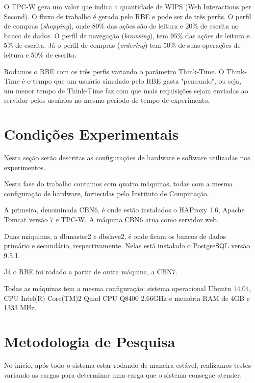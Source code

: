 \documentclass[11pt,twoside]{article}
\begin{document}
    O TPC-W gera um valor que indica a quantidade de WIPS (Web Interactions per Second). O fluxo de trabalho é gerado pelo RBE e pode ser de tr\^es perfis. O perfil de compras (\textit{shopping}), onde 80\% das a\c{c}\~oes são de leitura e 20\% de escrita no banco de dados. O perfil de navega\c{c}\~ao (\textit{browsing}), tem 95\% das a\c{c}\~oes de leitura e 5\% de escrita. J\'a o perfil de compras (\textit{ordering}) tem 50\% de suas opera\c{c}\~oes de leitura e 50\% de escrita.

    Rodamos o RBE com os três perfis variando o parâmetro Think-Time. O Think-Time é o tempo que um usuário simulado pelo RBE gasta "pensando", ou seja, um menor tempo de Think-Time faz com que mais requisições sejam enviadas ao servidor pelos usuários no mesmo período de tempo de experimento.

\setlength{\parindent}{4ex}


\section{Condições Experimentais}
\setlength{\parindent}{4ex}
     Nesta se\c{c}\~ao ser\~ao descritas as configura\c{c}\~oes de hardware e software utilizadas nos experimentos.

     Nesta fase do trabalho contamos com quatro máquinas, todas com a mesma configuração de hardware, fornecidas pelo Instituto de Computação.

     A primeira, denominada CBN6, é onde estão instalados o HAProxy 1.6, Apache Tomcat versão 7 e TPC-W. A máquina CBN6 atua como servidor web.

     Duas máquinas, a dbmaster2 e dbslave2, é onde ficam os bancos de dados primário e secundário, respectivamente. Nelas está instalado o PostgreSQL vers\~ao 9.5.1.

     Já o RBE foi rodado a partir de outra máquina, a CBN7.

     Todas as máquinas tem a mesma configuração: sistema operacional Ubuntu 14.04, CPU Intel(R) Core(TM)2 Quad CPU Q8400 2.66GHz e mem\'oria RAM de 4GB e 1333 MHz.

\section{Metodologia de Pesquisa}
\setlength{\parindent}{4ex}
No início, após todo o sistema estar rodando de maneira estável, realizamos testes variando as cargas para determinar uma carga que o sistema consegue atender.
\end{document}
